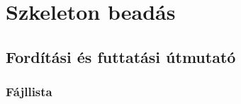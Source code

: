 %
\chapter{Szkeleton beadás}

\thispagestyle{fancy}

\section{Fordítási és futtatási útmutató}

\subsection{Fájllista}

